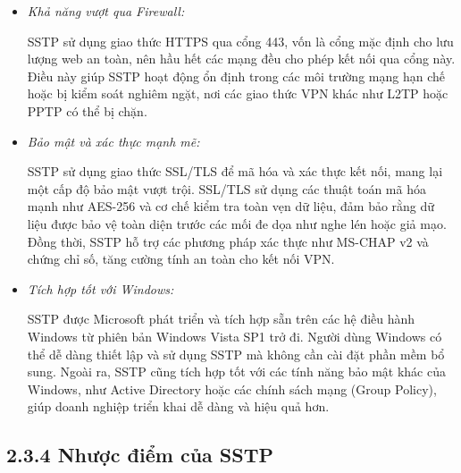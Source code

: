  \begin{itemize}
        \item \textit{Khả năng vượt qua Firewall:}
        
         SSTP sử dụng giao thức HTTPS qua cổng 443, vốn là cổng mặc định cho lưu lượng web an toàn, nên hầu hết các mạng đều cho phép kết nối qua cổng này. Điều này giúp SSTP hoạt động ổn định trong các môi trường mạng hạn chế hoặc bị kiểm soát nghiêm ngặt, nơi các giao thức VPN khác như L2TP hoặc PPTP có thể bị chặn.
        \item \textit{Bảo mật và xác thực mạnh mẽ:}

        SSTP sử dụng giao thức SSL/TLS để mã hóa và xác thực kết nối, mang lại một cấp độ bảo mật vượt trội. SSL/TLS sử dụng các thuật toán mã hóa mạnh như AES-256 và cơ chế kiểm tra toàn vẹn dữ liệu, đảm bảo rằng dữ liệu được bảo vệ toàn diện trước các mối đe dọa như nghe lén hoặc giả mạo. Đồng thời, SSTP hỗ trợ các phương pháp xác thực như MS-CHAP v2 và chứng chỉ số, tăng cường tính an toàn cho kết nối VPN.

        \item \textit{Tích hợp tốt với Windows:}

        SSTP được Microsoft phát triển và tích hợp sẵn trên các hệ điều hành Windows từ phiên bản Windows Vista SP1 trở đi. Người dùng Windows có thể dễ dàng thiết lập và sử dụng SSTP mà không cần cài đặt phần mềm bổ sung. Ngoài ra, SSTP cũng tích hợp tốt với các tính năng bảo mật khác của Windows, như Active Directory hoặc các chính sách mạng (Group Policy), giúp doanh nghiệp triển khai dễ dàng và hiệu quả hơn.
    \end{itemize} 
 
 \subsection*{2.3.4 Nhược điểm của SSTP}

